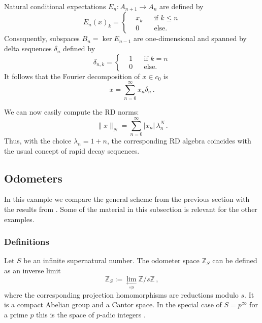 \documentclass[12pt,reqno]{amsart}
\numberwithin{equation}{section}
\newcommand{\Z}{{\mathbb Z}}
\begin{document}
Natural conditional expectations $E_n:A_{n+1}\to A_n$ are defined by 
\begin{equation*}
E_n(x)_k = \left\{
\begin{aligned}
&x_k &&\textrm{if }k\leq n  \\
&0 &&\textrm{else.}
\end{aligned}\right.
\end{equation*}
Consequently, subspaces $B_n=\ker E_{n-1}$ are one-dimensional and spanned by delta sequences $\delta_n$ defined by
\begin{equation*}
\delta_{n,k} = \left\{
\begin{aligned}
&1 &&\textrm{if }k=n  \\
&0 &&\textrm{else.}
\end{aligned}\right.
\end{equation*}
It follows that the Fourier decomposition of $x\in c_0$ is
\begin{equation*}
x=\sum_{n=0}^\infty x_n\delta_n\,.
\end{equation*}

We can now easily compute the RD norms:
\begin{equation*}
\|x\|_N=\sum_{n=0}^\infty |x_n|\,\lambda_n^N\,.
\end{equation*}
Thus, with the choice $\lambda_n=1+n$, the corresponding RD algebra coincides with the usual concept of rapid decay sequences.

\subsection{Odometers} 
In this example we compare the general scheme from the previous section with the results from \cite{KM2}. Some of the material in this subsection is relevant for the other examples.

\subsubsection{Definitions}

Let $S$ be an infinite supernatural number. The odometer space $\Z_S$ can be defined as an inverse limit
\begin{equation*}
\Z_S:=\lim_{\underset{s|S}{\longleftarrow}} \Z/ s\Z \,,
\end{equation*}
where the corresponding projection homomorphisms are reductions modulo $s$. It is a compact Abelian group and a Cantor space. In the special case of $S=p^\infty$ for a prime $p$ this is the space of $p$-adic integers \cite{Do}.
\end{document}
